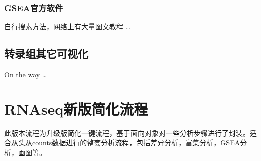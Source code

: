 \documentclass[
]{book}
\begin{document}
\subsection{GSEA官方软件}\label{gseaux5b98ux65b9ux8f6fux4ef6}

自行搜素方法，网络上有大量图文教程 \ldots{}

\section{转录组其它可视化}\label{visual}

On the way \ldots{}

\chapter{RNAseq新版简化流程}\label{rnaseq_new_pipeline}

此版本流程为升级版简化一键流程，基于面向对象对一些分析步骤进行了封装。适合从头从counts数据进行的整套分析流程，包括差异分析，富集分析，GSEA分析，画图等。
\end{document}
